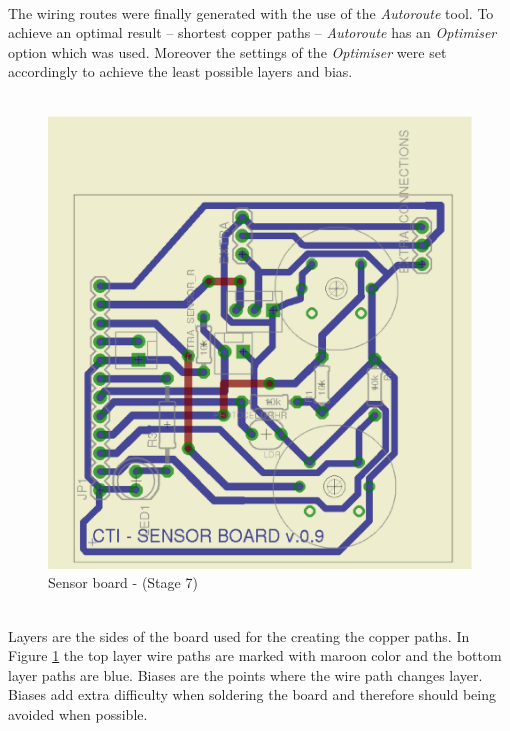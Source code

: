 \documentclass[12pt,a4paper]{report}
\begin{document}
\ \\
The wiring routes were finally generated with the use of the \textit{Autoroute} tool.
To achieve an optimal result -- shortest copper paths -- \textit{Autoroute} has an \textit{Optimiser} option which was used.
Moreover the settings of the \textit{Optimiser} were set accordingly to achieve the least possible layers and bias.\\
\ \\
\begin{figure}[H]
\centering
\includegraphics*[scale=0.25]{sens_brd_s8}
\caption{Sensor board -  (Stage 7)}
\label{Sensor-brd-s8}
\end{figure}
\ \\
Layers are the sides of the board used for the creating the copper paths.
In Figure \ref{Sensor-brd-s8} the top layer wire paths are marked with maroon color and the bottom layer paths are blue.
Biases are the points where the wire path changes layer.
Biases add extra difficulty when soldering the board and therefore should being avoided when possible.\\
\ \\
%
\end{document}

